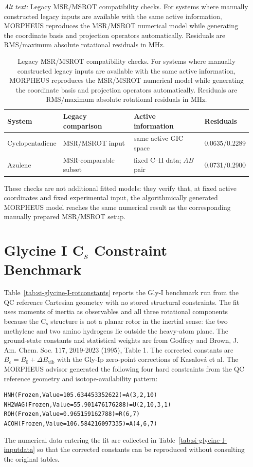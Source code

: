 \documentclass[12pt]{article}
\begin{document}
\begin{table}
\caption{Legacy MSR/MSROT compatibility checks. For systems where manually
constructed legacy inputs are available with the same active information,
MORPHEUS reproduces the MSR/MSROT numerical model while generating the
coordinate basis and projection operators automatically. Residuals are
RMS/maximum absolute rotational residuals in MHz.}
\label{tab:si-msrot-checks}
\par\smallskip\noindent\textit{Alt text:} Legacy MSR/MSROT compatibility checks. For systems where manually constructed legacy inputs are available with the same active information, MORPHEUS reproduces the MSR/MSROT numerical model while generating the coordinate basis and projection operators automatically. Residuals are RMS/maximum absolute rotational residuals in MHz.
\footnotesize
\begin{tabular}{llll}
\toprule
System & Legacy comparison & Active information & Residuals \\
\midrule
Cyclopentadiene & MSR/MSROT input & same active GIC space & 0.0635/0.2289 \\
Azulene & MSR-comparable subset & fixed C--H data; $AB$ pair & 0.0731/0.2900 \\
\bottomrule
\end{tabular}
\end{table}

These checks are not additional fitted models: they verify that, at fixed
active coordinates and fixed experimental input, the algorithmically generated
MORPHEUS model reaches the same numerical result as the corresponding
manually prepared MSR/MSROT setup.

\section{\texorpdfstring{Glycine I C$_s$ Constraint Benchmark}{Glycine I Cs Constraint Benchmark}}

Table~\ref{tab:si-glycine-I-rotconstants} reports the Gly-I benchmark run from
the QC reference Cartesian geometry with no stored structural constraints. The fit uses
moments of inertia as observables and all three rotational components because
the C$_s$ structure is not a planar rotor in the inertial sense: the two
methylene and two amino hydrogens lie outside the heavy-atom plane. The
ground-state constants and statistical weights are from Godfrey and Brown,
J. Am. Chem. Soc. 117, 2019-2023 (1995), Table 1. The corrected constants are
$B_e=B_0+\Delta B_\mathrm{vib}$ with the Gly-Ip zero-point corrections of
Kasalov{\'a} et al. The MORPHEUS advisor generated the following four hard
constraints from the QC reference geometry and isotope-availability pattern:
\begin{verbatim}
HNH(Frozen,Value=105.634453352622)=A(3,2,10)
NH2WAG(Frozen,Value=55.901476176288)=U(2,10,3,1)
ROH(Frozen,Value=0.965159162788)=R(6,7)
ACOH(Frozen,Value=106.584216097335)=A(4,6,7)
\end{verbatim}
The numerical data entering the fit are collected in
Table~\ref{tab:si-glycine-I-inputdata} so that the corrected constants can be
reproduced without consulting the original tables.
\end{document}
